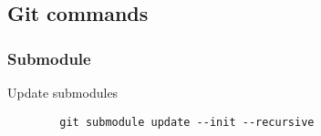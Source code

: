 \documentclass[../LabBook]{subfiles}
\begin{document}
    \subsection{Git commands}

    \subsubsection{Submodule}
    Update submodules
    \begin{verbatim}
        git submodule update --init --recursive
    \end{verbatim}
\end{document}
